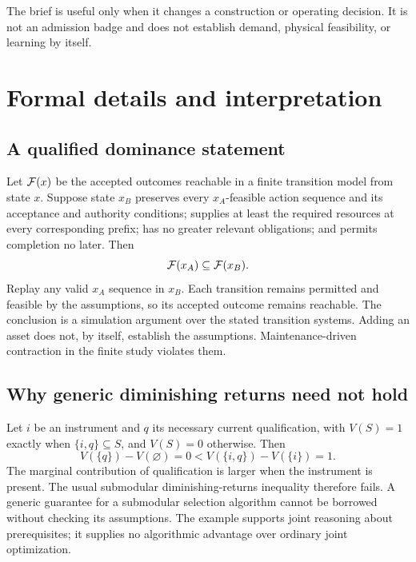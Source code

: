 The brief is useful only when it changes a construction or operating decision. It is not an admission badge and does not establish demand, physical feasibility, or learning by itself.

\section{Formal details and interpretation}
\label{app:formal}

\subsection{A qualified dominance statement}

Let $\mathcal{F}(x)$ be the accepted outcomes reachable in a finite transition model from state $x$. Suppose state $x_B$ preserves every $x_A$-feasible action sequence and its acceptance and authority conditions; supplies at least the required resources at every corresponding prefix; has no greater relevant obligations; and permits completion no later. Then
\begin{equation}
\mathcal{F}(x_A)\subseteq\mathcal{F}(x_B).
\end{equation}
Replay any valid $x_A$ sequence in $x_B$. Each transition remains permitted and feasible by the assumptions, so its accepted outcome remains reachable. The conclusion is a simulation argument over the stated transition systems. Adding an asset does not, by itself, establish the assumptions. Maintenance-driven contraction in the finite study violates them.

\subsection{Why generic diminishing returns need not hold}

Let $i$ be an instrument and $q$ its necessary current qualification, with $V(S)=1$ exactly when $\{i,q\}\subseteq S$, and $V(S)=0$ otherwise. Then
\begin{equation}
V(\{q\})-V(\varnothing)=0
<V(\{i,q\})-V(\{i\})=1.
\end{equation}
The marginal contribution of qualification is larger when the instrument is present. The usual submodular diminishing-returns inequality therefore fails. A generic guarantee for a submodular selection algorithm cannot be borrowed without checking its assumptions. The example supports joint reasoning about prerequisites; it supplies no algorithmic advantage over ordinary joint optimization.

